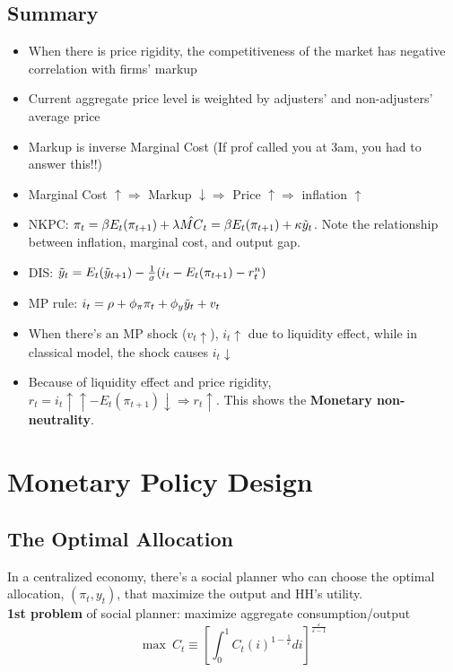 \documentclass{article}
\begin{document}
\subsection{Summary}
\begin{itemize}
    \item When there is price rigidity, the competitiveness of the market has negative correlation with firms' markup
    \item Current aggregate price level is weighted by adjusters' and non-adjusters' average price
    \item Markup is inverse Marginal Cost (If prof called you at 3am, you had to answer this!!)
    \item Marginal Cost $\uparrow \Rightarrow$ Markup $\downarrow \Rightarrow$ Price $\uparrow \Rightarrow$ inflation $\uparrow$
    \item NKPC: $\pi_t = \beta E_t(\pi_{t+1}) + \lambda \hat{MC}_t = \beta E_t(\pi_{t+1}) + \kappa \Tilde{y}_t$. Note the relationship between inflation, marginal cost, and output gap.
    \item DIS: $\Tilde{y}_t = E_t(\Tilde{y}_{t+1}) - \frac{1}{\sigma}(i_t - E_t(\pi_{t+1}) - r_t^n)$
    \item MP rule: $i_t = \rho + \phi_\pi \pi_t + \phi_y \Tilde{y}_t + v_t$
    \item When there's an MP shock ($v_t\uparrow$), $i_t\uparrow$ due to liquidity effect, while in classical model, the shock causes $i_t\downarrow$
    \item Because of liquidity effect and price rigidity, $r_t = i_t \uparrow\uparrow - E_t(\pi_{t+1})\downarrow \Rightarrow r_t \uparrow$. This shows the \textbf{Monetary non-neutrality}.
\end{itemize}

\pagebreak

\section{Monetary Policy Design}
\subsection{The Optimal Allocation}
In a centralized economy, there's a social planner who can choose the optimal allocation, $(\pi_t, y_t)$, that maximize the output and HH's utility.\\

\textbf{1st problem} of social planner: maximize aggregate consumption/output
$$\max\ C_t \equiv \left[\int_0^1 C_t(i)^{1-\frac{1}{\varepsilon}}di\right]^{\frac{\varepsilon}{\varepsilon - 1}}$$
\end{document}
